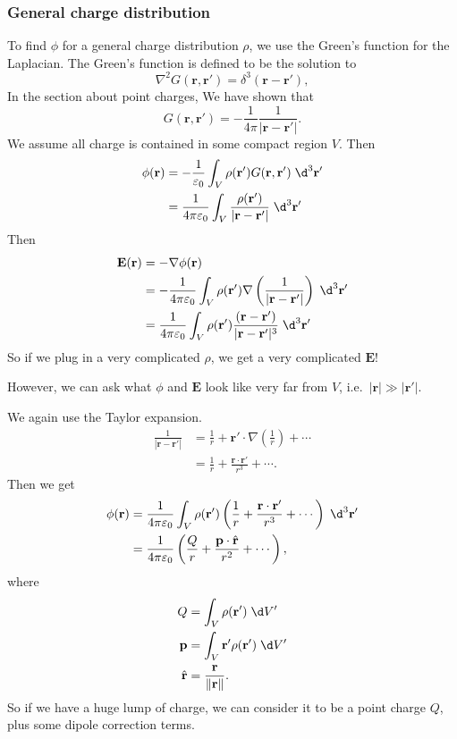 \documentclass[a4paper]{article}
\begin{document}
\subsubsection{General charge distribution}
To find $\phi$ for a general charge distribution $\rho$, we use the Green's function for the Laplacian. The Green's function is defined to be the solution to
\[
  \nabla^2 G(\mathbf{r}, \mathbf{r}') = \delta^3(\mathbf{r} - \mathbf{r}'),
\]
In the section about point charges, We have shown that
\[
  G(\mathbf{r}, \mathbf{r}') = -\frac{1}{4\pi}\frac{1}{|\mathbf{r} - \mathbf{r}'|}.
\]
We assume all charge is contained in some compact region $V$. Then
\begin{align*}
  \phi(\mathbf{r}) &= -\frac{1}{\varepsilon_0}\int_V \rho(\mathbf{r}') G(\mathbf{r}, \mathbf{r}')\;\d^3 \mathbf{r}'\\
  &= \frac{1}{4\pi\varepsilon_0}\int_V \frac{\rho(\mathbf{r}')}{|\mathbf{r} - \mathbf{r}'|}\;\d^3 \mathbf{r}'
\end{align*}
Then
\begin{align*}
  \mathbf{E}(\mathbf{r}) &= -\nabla \phi(\mathbf{r})\\
  &=- \frac{1}{4\pi\varepsilon_0} \int_V \rho(\mathbf{r}')\nabla \left(\frac{1}{|\mathbf{r} - \mathbf{r}'|}\right)\;\d^3 \mathbf{r}'\\
  &= \frac{1}{4\pi\varepsilon_0}\int_V \rho(\mathbf{r}')\frac{(\mathbf{r} - \mathbf{r}')}{|\mathbf{r} - \mathbf{r}'|^3}\;\d^3 \mathbf{r}'
\end{align*}
So if we plug in a very complicated $\rho$, we get a very complicated $\mathbf{E}$!

However, we can ask what $\phi$ and $\mathbf{E}$ look like very far from $V$, i.e.\ $|\mathbf{r}| \gg |\mathbf{r}'|$.

We again use the Taylor expansion.
\begin{align*}
  \frac{1}{|\mathbf{r} - \mathbf{r}'|} &= \frac{1}{r} + \mathbf{r}'\cdot \nabla\left(\frac{1}{r}\right) + \cdots\\
  &= \frac{1}{r} + \frac{\mathbf{r}\cdot \mathbf{r}'}{r^3} + \cdots.
\end{align*}
Then we get
\begin{align*}
  \phi(\mathbf{r}) &= \frac{1}{4\pi\varepsilon_0} \int_V \rho(\mathbf{r}')\left(\frac{1}{r} + \frac{\mathbf{r}\cdot \mathbf{r}'}{r^3} + \cdots\right)\;\d^3 \mathbf{r}'\\
  &= \frac{1}{4\pi\varepsilon_0}\left(\frac{Q}{r} + \frac{\mathbf{p}\cdot \hat{\mathbf{r}}}{r^2} + \cdots\right),
\end{align*}
where
\begin{align*}
  Q &= \int_V \rho(\mathbf{r}')\;\d V' \\
  \mathbf{p} &= \int_V \mathbf{r}'\rho(\mathbf{r}')\; \d V'\\
  \hat{\mathbf{r}} &= \frac{\mathbf{r}}{\|\mathbf{r}\|}.
\end{align*}
So if we have a huge lump of charge, we can consider it to be a point charge $Q$, plus some dipole correction terms.
\end{document}

